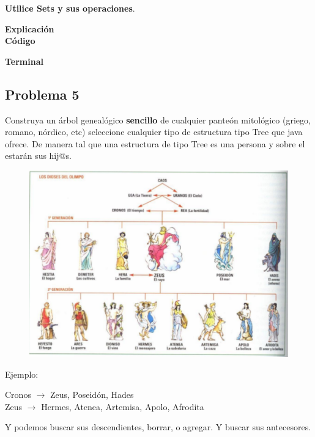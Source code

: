 \documentclass[11pt, twocolumn]{article}
\begin{document}
  \textbf{Utilice Sets y sus operaciones}.

  \textbf{Explicación} \\
  

  \textbf{Código}


  \textbf{Terminal}

  \subsection*{Problema 5}
  Construya un árbol genealógico \textbf{sencillo} de cualquier panteón mitológico (griego, romano, nórdico, etc) seleccione cualquier tipo de estructura tipo Tree que java ofrece. De manera tal que una estructura de tipo Tree es una persona y sobre el estarán sus hij@s.

  \begin{figure}[ht]
    \includegraphics[width=\columnwidth, center]{Arbol.png}
  \end{figure}
  
  Ejemplo:

  Cronos $\rightarrow$ Zeus, Poseidón, Hades \\
  Zeus $\rightarrow$ Hermes, Atenea, Artemisa, Apolo, Afrodita

  Y podemos buscar sus descendientes, borrar, o agregar. Y buscar sus antecesores.
\end{document}

